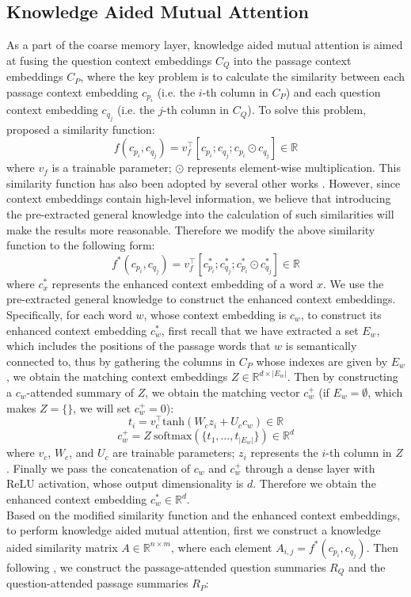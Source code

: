 \documentclass[11pt,a4paper]{article}
\begin{document}
\subsection{Knowledge Aided Mutual Attention}
As a part of the coarse memory layer, knowledge aided mutual attention is aimed at fusing the question context embeddings $C_Q$ into the passage context embeddings $C_P$, where the key problem is to calculate the similarity between each passage context embedding $c_{p_i}$ (i.e. the $i$-th column in $C_P$) and each question context embedding $c_{q_j}$ (i.e. the $j$-th column in $C_Q$). To solve this problem, \citet{seominjoon:2016} proposed a similarity function:
\[f(c_{p_i}, c_{q_j}) = v_f^\top [c_{p_i}; c_{q_j}; c_{p_i} \odot c_{q_j}] \in \mathbb{R}\]
where $v_f$ is a trainable parameter; $\odot$ represents element-wise multiplication. This similarity function has also been adopted by several other works \cite{clarkchristopher:2017,yuadamswei:2018}. However, since context embeddings contain high-level information, we believe that introducing the pre-extracted general knowledge into the calculation of such similarities will make the results more reasonable. Therefore we modify the above similarity function to the following form:
\[f^*(c_{p_i}, c_{q_j}) = v_f^\top [c^*_{p_i}; c^*_{q_j}; c^*_{p_i} \odot c^*_{q_j}] \in \mathbb{R}\]
where $c^*_x$ represents the enhanced context embedding of a word $x$. We use the pre-extracted general knowledge to construct the enhanced context embeddings. Specifically, for each word $w$, whose context embedding is $c_w$, to construct its enhanced context embedding $c^*_w$, first recall that we have extracted a set $E_w$, which includes the positions of the passage words that $w$ is semantically connected to, thus by gathering the columns in $C_P$ whose indexes are given by $E_w$, we obtain the matching context embeddings $Z \in \mathbb{R}^{d \times |E_w|}$. Then by constructing a $c_w$-attended summary of $Z$, we obtain the matching vector $c^+_w$ (if $E_w = \emptyset$, which makes $Z = \{\}$, we will set $c^+_w = 0$):
\[t_i = v_c^\top \mathrm{tanh}(W_c z_i + U_c c_w) \in \mathbb{R}\]
\[c^+_w = Z \ \mathrm{softmax}(\{t_1, \ldots, t_{|E_w|}\}) \in \mathbb{R}^{d}\]
where $v_c$, $W_c$, and $U_c$ are trainable parameters; $z_i$ represents the $i$-th column in $Z$. Finally we pass the concatenation of $c_w$ and $c^+_w$ through a dense layer with ReLU activation, whose output dimensionality is $d$. Therefore we obtain the enhanced context embedding $c^*_w \in \mathbb{R}^{d}$. \\
Based on the modified similarity function and the enhanced context embeddings, to perform knowledge aided mutual attention, first we construct a knowledge aided similarity matrix $A \in \mathbb{R}^{n \times m}$, where each element $A_{i,j} = f^*(c_{p_i}, c_{q_j})$. Then following \citet{yuadamswei:2018}, we construct the passage-attended question summaries $R_Q$ and the question-attended passage summaries $R_P$:
\end{document}
